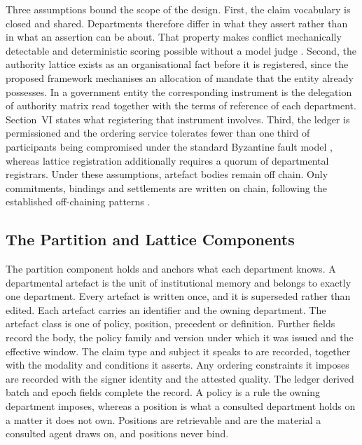 \documentclass[journal]{IEEEtran}
\begin{document}
Three assumptions bound the scope of the design. First, the claim vocabulary is closed and shared. Departments therefore differ in what they assert rather than in what an assertion can be about. That property makes conflict mechanically detectable and deterministic scoring possible without a model judge \cite{wang2024unfair}. Second, the authority lattice exists as an organisational fact before it is registered, since the proposed framework mechanises an allocation of mandate that the entity already possesses. In a government entity the corresponding instrument is the delegation of authority matrix read together with the terms of reference of each department. Section~VI states what registering that instrument involves. Third, the ledger is permissioned and the ordering service tolerates fewer than one third of participants being compromised under the standard Byzantine fault model \cite{castro2002pbft}, whereas lattice registration additionally requires a quorum of departmental registrars. Under these assumptions, artefact bodies remain off chain. Only commitments, bindings and settlements are written on chain, following the established off-chaining patterns \cite{eberhardt2017offchain}.

\subsection{The Partition and Lattice Components}

The partition component holds and anchors what each department knows. A departmental artefact is the unit of institutional memory and belongs to exactly one department. Every artefact is written once, and it is superseded rather than edited. Each artefact carries an identifier and the owning department. The artefact class is one of policy, position, precedent or definition. Further fields record the body, the policy family and version under which it was issued and the effective window. The claim type and subject it speaks to are recorded, together with the modality and conditions it asserts. Any ordering constraints it imposes are recorded with the signer identity and the attested quality. The ledger derived batch and epoch fields complete the record. A policy is a rule the owning department imposes, whereas a position is what a consulted department holds on a matter it does not own. Positions are retrievable and are the material a consulted agent draws on, and positions never bind.
\end{document}
